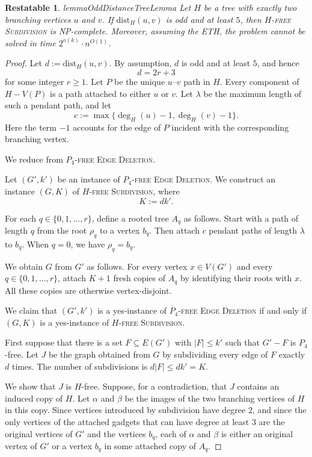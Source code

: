 \documentclass[10pt,a4paper]{amsart}
\newtheorem{restatable}{Restatable}
\newcommand{\dist}{\mathrm{dist}}
\begin{document}
\begin{restatable}{lemma}{OddDistanceTreeLemma}
\label{lem:tree-odd-distance-large}
Let $H$ be a tree with exactly two branching vertices $u$ and $v$.
If $\dist_H(u,v)$ is odd and at least $5$, then
\textsc{$H$-free Subdivision} is \textsf{NP}-complete.
Moreover, assuming the ETH, the problem cannot be solved in time
$2^{o(k)}\cdot n^{O(1)}$.
\end{restatable}

\begin{proof}

Let $d:=\dist_H(u,v)$. By assumption, $d$ is odd and at least $5$, and hence
\[
    d=2r+3
\]
for some integer $r\geq 1$.  Let $P$ be the unique $u$--$v$ path in $H$.
Every component of $H-V(P)$ is a path attached to either $u$ or $v$.  Let
$\lambda$ be the maximum length of such a pendant path, and let
\[
    c:=\max\{\deg_H(u)-1,\deg_H(v)-1\}.
\]
Here the term $-1$ accounts for the edge of $P$ incident with the corresponding
branching vertex.

We reduce from \textsc{$P_4$-free Edge Deletion}. %

Let $(G',k')$ be an instance of \textsc{$P_4$-free Edge Deletion}.  We construct
an instance $(G,K)$ of \textsc{$H$-free Subdivision}, where
\[
    K:=d k'.
\]

For each $q\in\{0,1,\ldots,r\}$, define a rooted tree $A_q$ as follows.
Start with a path of length $q$ from the root $\rho_q$ to a vertex $b_q$.
Then attach $c$ pendant paths of length $\lambda$ to $b_q$.
When $q=0$, we have $\rho_q=b_q$.

We obtain $G$ from $G'$ as follows.  For every vertex $x\in V(G')$ and every
$q\in\{0,1,\ldots,r\}$, attach $K+1$ fresh copies of $A_q$ by identifying
their roots with $x$.  All these copies are otherwise vertex-disjoint.

We claim that $(G',k')$ is a yes-instance of
\textsc{$P_4$-free Edge Deletion} if and only if $(G,K)$ is a yes-instance of
\textsc{$H$-free Subdivision}.

First suppose that there is a set $F\subseteq E(G')$ with $|F|\leq k'$ such
that $G'-F$ is $P_4$-free.  Let $J$ be the graph obtained from $G$ by subdividing
every edge of $F$ exactly $d$ times.  The number of subdivisions is
$d|F|\leq dk'=K$.

We show that $J$ is $H$-free.  Suppose, for a contradiction, that $J$ contains
an induced copy of $H$.  Let $\alpha$ and $\beta$ be the images of the two
branching vertices of $H$ in this copy.  Since vertices introduced by
subdivision have degree $2$, and since the only vertices of the attached
gadgets that can have degree at least $3$ are the original vertices of $G'$
and the vertices $b_q$, each of $\alpha$ and $\beta$ is either an original
vertex of $G'$ or a vertex $b_q$ in some attached copy of $A_q$.


\end{proof}
\end{document}
